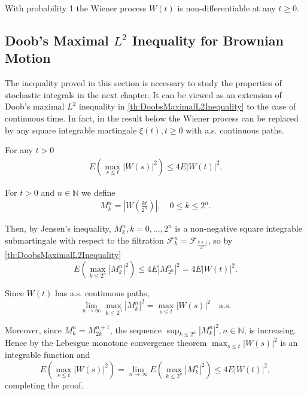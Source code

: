 \begin{Theorem}
\label{thm:wiener-nondifferentiable-everywhere}
With probability 1 the Wiener process $W(t)$ is non-differentiable at any $t \geq 0$.
\end{Theorem}

\subsection{Doob's Maximal $L^2$ Inequality for Brownian Motion}
\label{sec:doob-maximal-inequality}

The inequality proved in this section is necessary to study the properties of stochastic integrals in the next chapter. It can be viewed as an extension of Doob's maximal $L^2$ inequality in \cref{th:DoobsMaximalL2Inequality} to the case of continuous time. In fact, in the result below the Wiener process can be replaced by any square integrable martingale $\xi(t), t \geq 0$ with a.s. continuous paths.

\begin{Theorem}
\label{thm:doob-maximal-l2}
For any $t > 0$
\begin{align}
E\left(\max_{s \leq t} |W(s)|^2\right) \leq 4 E|W(t)|^2. \tag{6.6}
\end{align}
\end{Theorem}

\begin{Proof}
For $t > 0$ and $n \in \mathbb{N}$ we define
\begin{align}
M_k^n = \left|W\left(\frac{kt}{2^n}\right)\right|, \quad 0 \leq k \leq 2^n. \tag{6.7}
\end{align}

Then, by Jensen's inequality, $M_k^n, k = 0, \ldots, 2^n$ is a non-negative square integrable submartingale with respect to the filtration $\mathcal{F}_k^n = \mathcal{F}_{\frac{k+1}{2^n}}$, so by \cref{th:DoobsMaximalL2Inequality}
\[
E\left(\max_{k \leq 2^n} |M_k^n|^2\right) \leq 4 E|M_{2^n}^n|^2 = 4 E|W(t)|^2.
\]

Since $W(t)$ has a.s. continuous paths,
\[
\lim_{n \to \infty} \max_{k \leq 2^n} |M_k^n|^2 = \max_{s \leq t} |W(s)|^2 \quad \text{a.s.}
\]

Moreover, since $M_k^n = M_{2k}^{n+1}$, the sequence $\sup_{k \leq 2^n} |M_k^n|^2, n \in \mathbb{N}$, is increasing. Hence by the Lebesgue monotone convergence theorem $\max_{s \leq t} |W(s)|^2$ is an integrable function and
\[
E\left(\max_{s \leq t} |W(s)|^2\right) = \lim_{n \to \infty} E\left(\max_{k \leq 2^n} |M_k^n|^2\right) \leq 4 E|W(t)|^2,
\]
completing the proof.
\end{Proof}

